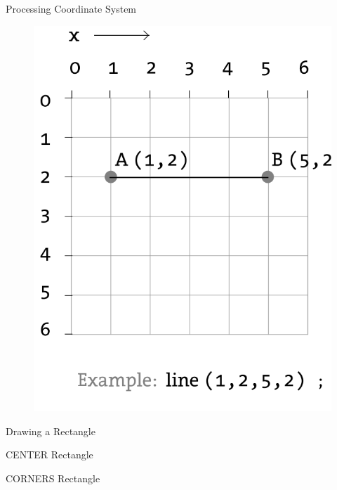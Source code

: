 \begin{frame}[fragile]{Processing Coordinate System}{}
\begin{figure}
    \begin{center}
        \includegraphics[width=.6\linewidth]{images/processing_coord.png}
    \end{center}
\end{figure}
\end{frame}

\begin{frame}[fragile]{Drawing a Rectangle}{}
\begin{figure}
    \begin{center}
        \def\svgwidth{\columnwidth}
        
    \end{center}
\end{figure}
\end{frame}

\begin{frame}[fragile]{CENTER Rectangle}{}
\begin{figure}
    \begin{center}
        \def\svgwidth{0.9\columnwidth}
        
    \end{center}
\end{figure}
\end{frame}

\begin{frame}[fragile]{CORNERS Rectangle}{}
\begin{figure}
    \begin{center}
        \def\svgwidth{0.9\columnwidth}
        
    \end{center}
\end{figure}
\end{frame}


